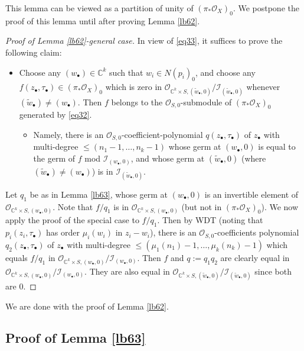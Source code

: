 \documentclass[12pt,b5paper,notitlepage]{report}
\theoremstyle{definition}
\theoremstyle{plain}
\newcommand{\mc}{\mathcal}
\newcommand{\wtd}{\widetilde}
\newcommand{\scr}{\mathscr}
\newcommand{\blt}{\bullet}
\newcommand{\Cbb}{\mathbb C}
\numberwithin{equation}{section}
\begin{document}
This lemma can be viewed as a partition of unity of $(\pi_*\scr O_X)_0$. We postpone the proof of this lemma until after proving Lemma \ref{lb62}.

\begin{proof}[Proof of Lemma \ref{lb62}-general case]
In view of \eqref{eq33}, it suffices to prove the following claim:
\begin{itemize}
\item Choose any $(w_\blt)\in\Cbb^k$ such that $w_i\in N(p_i)_0$, and choose any $f(z_\blt,\tau_\blt)\in(\pi_*\scr O_X)_0$ which is zero in $\scr O_{\Cbb^k\times S,(\wtd w_\blt,0)}/\mc I_{(\wtd w_\blt,0)}$ whenever $(\wtd w_\blt)\neq (w_\blt)$. Then $f$ belongs to the $\scr O_{S,0}$-submodule of $(\pi_*\scr O_X)_0$ generated by \eqref{eq32}.
\begin{itemize}
\item Namely, there is an $\scr O_{S,0}$-coefficient-polynomial $q(z_\blt,\tau_\blt)$ of $z_\blt$ with multi-degree $\leq (n_1-1,\dots,n_k-1)$ whose germ at $(w_\blt,0)$ is equal to the germ of $f$ mod $\mc I_{(w_\blt,0)}$, and whose germ at $(\wtd w_\blt,0)$ (where $(\wtd w_\blt)\neq (w_\blt)$) is in $\mc I_{(\wtd w_\blt,0)}$.
\end{itemize}
\end{itemize}

Let $q_1$ be as in Lemma \ref{lb63}, whose germ at $(w_\blt,0)$ is an invertible element of $\scr O_{\Cbb^k\times S,(w_\blt,0)}$. Note that $f/q_1$ is in $\scr O_{\Cbb^k\times S,(w_\blt,0)}$ (but not in $(\pi_*\scr O_X)_0$). We now apply the proof of the special case to $f/q_1$. Then by WDT (noting that $p_i(z_i,\tau_\blt)$ has order $\mu_i(w_i)$ in $z_i-w_i$), there is an $\scr O_{S,0}$-coefficients polynomial $q_2(z_\blt,\tau_\blt)$ of $z_\blt$ with multi-degree $\leq (\mu_1(n_1)-1,\dots,\mu_k(n_k)-1)$ which equals $f/q_1$ in $\scr O_{\Cbb^k\times S,(w_\blt,0)}/\mc I_{(w_\blt,0)}$. Then $f$ and $q:=q_1q_2$ are clearly equal in $\scr O_{\Cbb^k\times S,(w_\blt,0)}/\mc I_{(w_\blt,0)}$. They are also equal in $\scr O_{\Cbb^k\times S,(\wtd w_\blt,0)}/\mc I_{(\wtd w_\blt,0)}$ since both are $0$.
\end{proof}

We are done with the proof of Lemma \ref{lb62}.


\subsection{Proof of Lemma \ref{lb63}}
\end{document}
